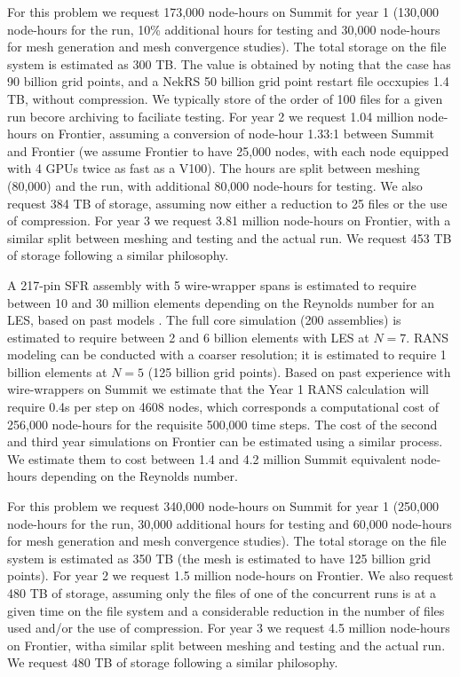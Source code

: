 For this problem we request  173,000 node-hours on Summit for year 1 (130,000 node-hours for the run, 10\% additional hours for testing and 30,000 node-hours for mesh generation and mesh convergence studies). The total storage on the file system is estimated as 300 TB. The value is obtained by noting that the case has 90 billion grid points, and a NekRS 50 billion grid point restart file occxupies 1.4 TB, without compression. We typically store of the order of 100 files for a given run becore archiving to faciliate testing. For year 2 we request 1.04 million node-hours on Frontier, assuming a conversion of node-hour 1.33:1 between Summit and Frontier (we assume Frontier to have 25,000 nodes, with each node equipped with 4 GPUs twice as fast as a V100). The hours are split between meshing (80,000) and the run, with additional 80,000 node-hours for testing. We also request 384 TB of storage, assuming now either a reduction to 25 files or the use of compression.  For year 3 we request 3.81 million node-hours on Frontier, with a similar split between meshing and testing and the actual run. We request 453 TB of storage following a similar philosophy.

A 217-pin SFR assembly with 5 wire-wrapper spans is estimated to require
between 10 and 30 million elements depending on the Reynolds number for an LES,
based on past models \cite{merzari2020toward}. The full core simulation (200
assemblies) is estimated to require between 2 and 6 billion elements with
LES at $N=7$.  RANS modeling can be conducted with a coarser resolution;
it is estimated to require 1 billion elements at $N=5$ (125 billion grid
points).
%
Based on past experience with wire-wrappers on Summit we estimate that the Year
1 RANS calculation will require 0.4s per step on 4608 nodes, which corresponds
a computational cost of 256,000 node-hours for the requisite 500,000 time steps.
%
The cost of the second and third year simulations on Frontier can be estimated
using a similar process. We estimate them to cost between 1.4 and 4.2 million
Summit equivalent node-hours depending on the Reynolds number.

For this problem we request  340,000 node-hours on Summit for year 1 (250,000 node-hours for the run, 30,000 additional hours for testing and 60,000 node-hours for mesh generation and mesh convergence studies). The total storage on the file system is estimated as 350 TB (the mesh is estimated to have 125 billion grid points).  For year 2 we request 1.5 million node-hours on Frontier. We also request 480 TB of storage, assuming only the files of one of the concurrent runs is at a given time on the file system and a considerable reduction in the number of files used and/or the use of compression.  For year 3 we request 4.5 million node-hours on Frontier, witha  similar split between meshing and testing and the actual run. We request 480 TB of storage following a similar philosophy. 


